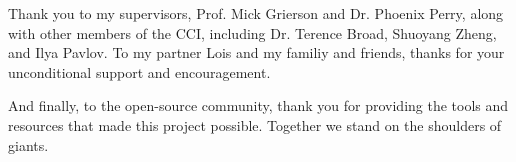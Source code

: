 Thank you to my supervisors, Prof. Mick Grierson and Dr. Phoenix Perry, along with other members of the CCI, including Dr. Terence Broad, Shuoyang Zheng, and Ilya Pavlov.
To my partner Lois and my familiy and friends, thanks for your unconditional support and encouragement.

And finally, to the open-source community, thank you for providing the tools and resources that made this project possible. Together we stand on the shoulders of giants.